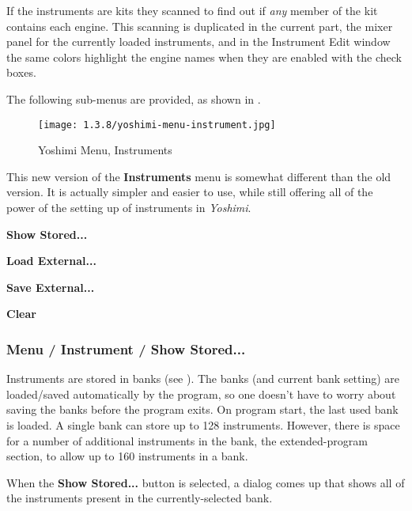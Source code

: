    If the instruments are kits they scanned to find out if 
   \textsl{any} member of the kit contains each engine.
   This scanning is duplicated in the current part, the mixer panel for the
   currently loaded instruments, and in the Instrument Edit window the same
   colors highlight the engine names when they are enabled with the check
   boxes. 

   The following sub-menus are provided, as shown in
   .

\begin{figure}[H]
   \centering 
   \texttt{[image: 1.3.8/yoshimi-menu-instrument.jpg]}
   \caption{Yoshimi Menu, Instruments}
   \label{fig:yoshimi_instrument_menu}
\end{figure}

   This new version of the \textbf{Instruments}
   menu is somewhat different than
   the old version.  It is actually simpler and easier to use, while still
   offering all of the power of the setting up of instruments in
   \textsl{Yoshimi}.

   \begin{enumber}
      \item \textbf{Show Stored...}
      \item \textbf{Load External...}
      \item \textbf{Save External...}
      \item \textbf{Clear}
   \end{enumber}


\subsubsection{Menu / Instrument / Show Stored...}
\label{subsubsec:menu_instrument_show}

   Instruments are stored in banks
   (see ).
   The banks (and current bank setting) are
   loaded/saved automatically by the program, so one doesn't have to worry
   about saving the banks before the program exits. On program start, the last
   used bank is loaded. A single bank can store up to 128 instruments.
   However, there is space for a number of additional instruments in the bank,
   the extended-program section, to allow up to 160 instruments in a bank.

   When the \textbf{Show Stored...} button is selected, a dialog comes
   up that shows all of the instruments present in the currently-selected
   bank.
   
